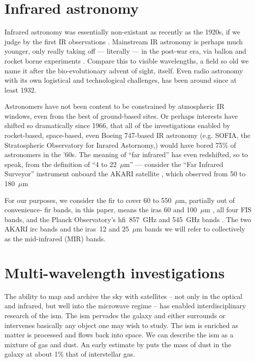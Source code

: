   \section{Infrared astronomy}

    Infrared astronomy was essentially non-existant as recently as the 1920s, if we judge by the first IR observations \citep{pettit22, pettit28}. Mainstream IR astronomy is perhaps much younger, only really taking off --- literally --- in the post-war era, via ballon and rocket borne experiments \citep{johnson66}. Compare this to visible wavelengths, a field so old we name it after the bio-evolutionary advent of sight, itself. Even radio astronomy with its own logistical and technological challenges, has been around since at least 1932.

    Astronomers have not been content to be constrained by atmospheric IR windows, even from the best of ground-based sites. Or perhaps interests have shifted so dramatically since 1966, that all of the investigations enabled by rocket-based, space-based, even Boeing 747-based IR astronomy (e.g. SOFIA, the Stratospheric Observatory for Inrared Astornomy,\cite{young12}) would have bored 75\% of astronomers in the '60s. The meaning of ``far infrared'' has even redshifted, so to speak, from the \cite{johnson66} definition of ``4 to 22~$\mu$m'' --- consider the ``Far Infrared Surveyor'' instrument onboard the AKARI satellite \citep{akari07}, which observed from 50 to 180~$\mu$m \citep{kawada07}

     For our purposes, we consider the \acrshort{fir} to cover 60 to 550~$\mu$m, partially out of convenience- \acrshort{fir} bands, in this paper, means the \acrlong{iras} 60 and 100~$\mu$m \citep{iras84}, all four FIS bands, and the Planck Observatory's \acrlong{hfi}~857~GHz and 545~GHz bands \citep{planckEarly11I, hfi14viii}. The two AKARI \acrlong{irc} \citep{irc07,ishihara10} bands and the \acrshort{iras}~12 and 25~$\mu$m bands we will refer to collectively as the mid-infrared (MIR) bands.

 \section{Multi-wavelength investigations}

     The ability to map and archive the sky with satellites -- not only in the optical and infrared, but well into the microwave regime -- has enabled interdisciplinary research of the \acrlong{ism}. The \acrshort{ism} pervades the galaxy and either surrounds or intervenes basically any object one may wish to study. The \acrshort{ism} is enriched as matter is processed and flows back into space. We can describe the \acrshort{ism} as a mixture of gas and dust. An early estimate by \cite{knapp74} puts the mass of dust in the galaxy at about 1\% that of interstellar gas.

